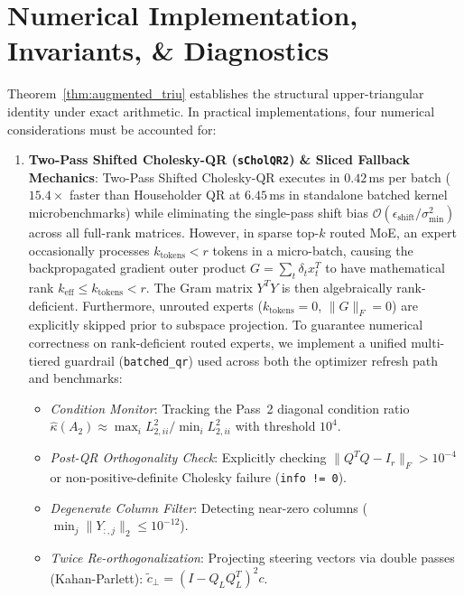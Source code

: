 \documentclass[10pt,twocolumn,letterpaper]{article}
\begin{document}
\section{Numerical Implementation, Invariants, \& Diagnostics}

Theorem~\ref{thm:augmented_triu} establishes the structural upper-triangular identity under exact arithmetic. In practical implementations, four numerical considerations must be accounted for:
\begin{enumerate}
    \item \textbf{Two-Pass Shifted Cholesky-QR (\texttt{sCholQR2}) \& Sliced Fallback Mechanics}: Two-Pass Shifted Cholesky-QR executes in $0.42$\,ms per batch ($15.4\times$ faster than Householder QR at $6.45$\,ms in standalone batched kernel microbenchmarks) while eliminating the single-pass shift bias $\mathcal{O}(\epsilon_{\text{shift}} / \sigma_{\min}^2)$ across all full-rank matrices. However, in sparse top-$k$ routed MoE, an expert occasionally processes $k_{\text{tokens}} < r$ tokens in a micro-batch, causing the backpropagated gradient outer product $G = \sum_{t} \delta_t x_t^T$ to have mathematical rank $k_{\text{eff}} \le k_{\text{tokens}} < r$. The Gram matrix $Y^T Y$ is then algebraically rank-deficient. Furthermore, unrouted experts ($k_{\text{tokens}} = 0$, $\|G\|_F = 0$) are explicitly skipped prior to subspace projection. To guarantee numerical correctness on rank-deficient routed experts, we implement a unified multi-tiered guardrail (\texttt{batched\_qr}) used across both the optimizer refresh path and benchmarks:
    \begin{itemize}
        \item \emph{Condition Monitor}: Tracking the Pass~2 diagonal condition ratio $\hat{\kappa}(A_2) \approx \max_i L_{2,ii}^2 / \min_i L_{2,ii}^2$ with threshold $10^4$.
        \item \emph{Post-QR Orthogonality Check}: Explicitly checking $\|Q^T Q - I_r\|_F > 10^{-4}$ or non-positive-definite Cholesky failure (\texttt{info != 0}).
        \item \emph{Degenerate Column Filter}: Detecting near-zero columns ($\min_j \|Y_{:, j}\|_2 \le 10^{-12}$).
        \item \emph{Twice Re-orthogonalization}: Projecting steering vectors via double passes (Kahan-Parlett): $\tilde{c}_\perp = (I - Q_L Q_L^T)^2 c$.

\end{itemize}
\end{enumerate}
\end{document}
